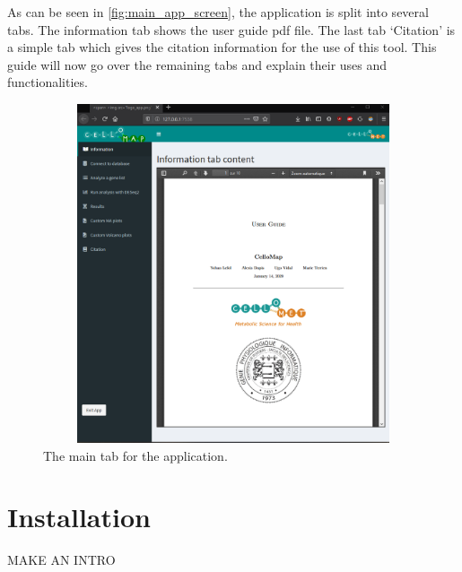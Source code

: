 \documentclass[11pt]{article}
\begin{document}
As can be seen in \autoref{fig:main_app_screen}, the application is split into several tabs. The information tab shows the user guide pdf file. The last tab `Citation' is a simple tab which gives the citation information for the use of this tool. This guide will now go over the remaining tabs and explain their uses and functionalities.
\begin{figure}[h!]
\centering
\includegraphics[width=15cm,height=10cm,keepaspectratio]{main_app_screen.png}
\caption{The main tab for the application.}
\label{fig:main_app_screen}
\end{figure}

\section{Installation}
MAKE AN INTRO
\end{document}
